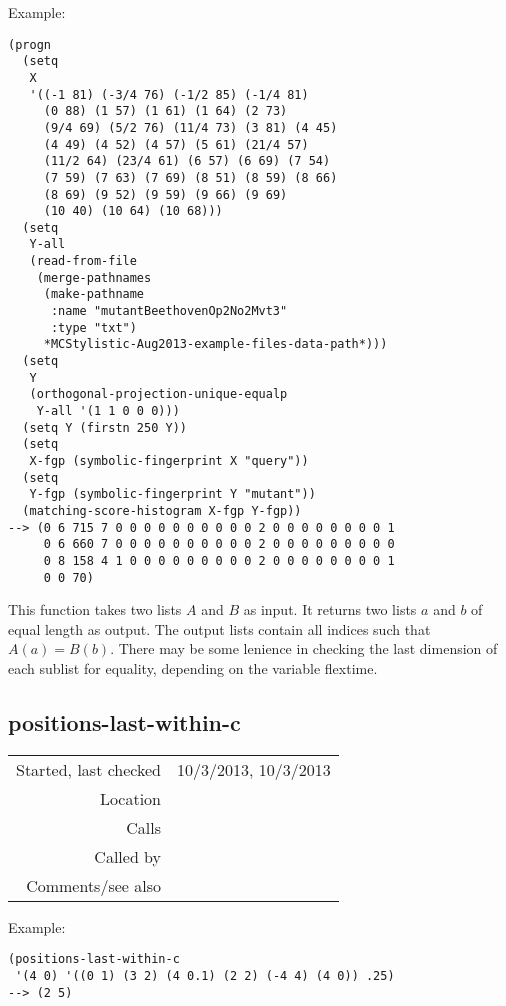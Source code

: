 \vspace{0.5cm}
\noindent Example:
\begin{verbatim}
(progn
  (setq
   X
   '((-1 81) (-3/4 76) (-1/2 85) (-1/4 81)
     (0 88) (1 57) (1 61) (1 64) (2 73)
     (9/4 69) (5/2 76) (11/4 73) (3 81) (4 45)
     (4 49) (4 52) (4 57) (5 61) (21/4 57)
     (11/2 64) (23/4 61) (6 57) (6 69) (7 54)
     (7 59) (7 63) (7 69) (8 51) (8 59) (8 66)
     (8 69) (9 52) (9 59) (9 66) (9 69)
     (10 40) (10 64) (10 68)))
  (setq
   Y-all
   (read-from-file
    (merge-pathnames
     (make-pathname
      :name "mutantBeethovenOp2No2Mvt3"
      :type "txt")
     *MCStylistic-Aug2013-example-files-data-path*)))
  (setq
   Y
   (orthogonal-projection-unique-equalp
    Y-all '(1 1 0 0 0)))
  (setq Y (firstn 250 Y))
  (setq
   X-fgp (symbolic-fingerprint X "query"))
  (setq
   Y-fgp (symbolic-fingerprint Y "mutant"))
  (matching-score-histogram X-fgp Y-fgp))
--> (0 6 715 7 0 0 0 0 0 0 0 0 0 0 2 0 0 0 0 0 0 0 0 1
     0 6 660 7 0 0 0 0 0 0 0 0 0 0 2 0 0 0 0 0 0 0 0 0
     0 8 158 4 1 0 0 0 0 0 0 0 0 0 2 0 0 0 0 0 0 0 0 1
     0 0 70)
\end{verbatim}

\noindent This function takes two lists $A$ and $B$ as
input. It returns two lists $a$ and $b$ of equal
length as output. The output lists contain all indices
such that $A(a) = B(b)$. There may be some lenience in
checking the last dimension of each sublist for
equality, depending on the variable flextime.


\subsection*{positions-last-within-c}\label{fun:positions-last-within-c}

\vspace{0.3cm}
\begin{tabular}{r|p{8cm}}
Started, last checked & 10/3/2013, 10/3/2013 \\
Location & \nameref{sec:matching-score} \\
Calls & \nameref{fun:my-last} \\
Called by & \nameref{fun:matching-score-histogram} \\
Comments/see also &
\end{tabular}

\vspace{0.5cm}
\noindent Example:
\begin{verbatim}
(positions-last-within-c
 '(4 0) '((0 1) (3 2) (4 0.1) (2 2) (-4 4) (4 0)) .25)
--> (2 5)
\end{verbatim}

